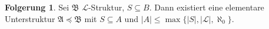 \documentclass[12pt,parskip=full]{scrartcl}
\newcommand{\abs}[1]{{\left| #1 \right|}}
\theoremstyle{definition}
\newtheorem{corollary}[theorem]{Folgerung}
\begin{document}
	\begin{corollary}
		Sei $\mathfrak{B}$ $\mathcal{L}$-Struktur, $S \subseteq B$. Dann existiert eine elementare Unterstruktur $\mathfrak{A} \preceq \mathfrak{B}$ mit $S \subseteq A$ und $\abs{A} \leq \max \{ \abs{S}, \abs{\mathcal{L}}, \aleph_0 \}$.
	\end{corollary}
\end{document}
